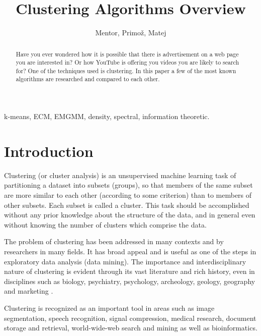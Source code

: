 \documentclass[conference]{IEEEtran}
\begin{document}
\title{Clustering Algorithms Overview}
\author{Mentor, Primož, Matej}
\author{
}
\maketitle

\begin{abstract}
Have you ever wondered how it is possible that there is advertisement on a web page you
are interested in? Or how YouTube is offering you videos you are likely to search for? 
One of the techniques used is clustering. In this paper a few of the most known
algorithms are researched and compared to each other.
\end{abstract}

\begin{IEEEkeywords}
k-means, ECM, EMGMM, density, spectral, information theoretic.
\end{IEEEkeywords}

\section{Introduction}
Clustering (or cluster analysis) is an unsupervised machine learning task of partitioning
a dataset into subsets (groups), so that members of the same subset are more similar to each other
(according to some criterion) than to members of other subsets. Each subset is called a cluster.
This task should be accomplished without any prior knowledge about the structure of the data, and in general
even without knowing the number of clusters which comprise the data.

The problem of clustering has been addressed in many contexts and by researchers in many fields. It has
broad appeal and is useful as one of the steps in exploratory data analysis (data mining). The importance
and interdisciplinary nature of clustering is evident through its vast literature and rich history, even
in disciplines such as biology, psychiatry, psychology, archeology, geology, geography and
marketing \cite{jaindubes88}.%

Clustering is recognized as an important tool in areas such as image segmentation,
speech recognition, signal compression, medical research, document storage and retrieval,
world-wide-web search and mining as well as bioinformatics.
\end{document}
